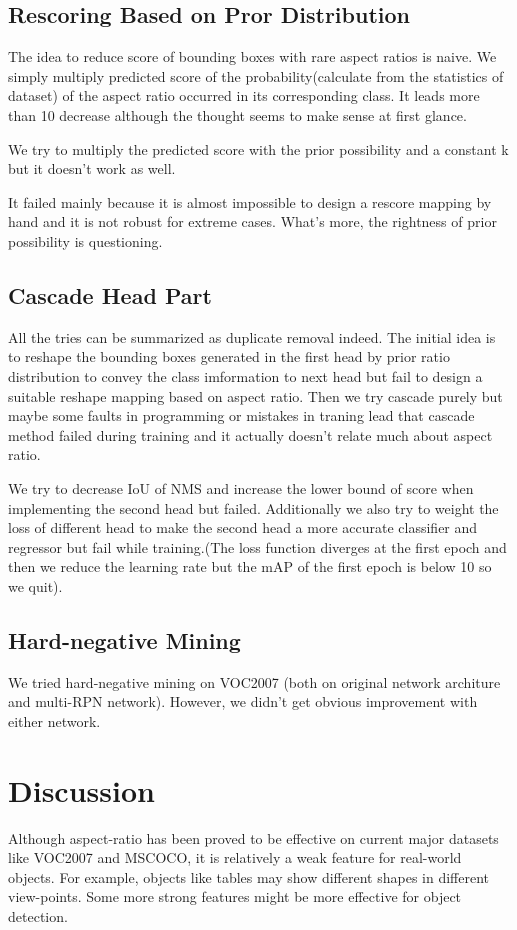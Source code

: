 \documentclass[10pt,twocolumn,letterpaper]{article}
\begin{document}
\subsection{Rescoring Based on Pror Distribution}
The idea to reduce score of bounding boxes with rare aspect ratios is naive. We simply multiply predicted score of the probability(calculate from the statistics of dataset) of the aspect ratio occurred in its corresponding class. It leads more than 10 decrease although the thought seems to make sense at first glance.
\par
We try to multiply the predicted score with the prior possibility and a constant k but it doesn't work as well.
\par
It failed mainly because it is almost impossible to design a rescore mapping by hand and it is not robust for extreme cases. What's more, the rightness of prior possibility is questioning.

\subsection{Cascade Head Part}
\par
All the tries can be summarized as duplicate removal indeed. The initial idea is to reshape the bounding boxes generated in the first head by prior ratio distribution to convey the class imformation to next head but fail to design a suitable reshape mapping based on aspect ratio. Then we try cascade purely but maybe some faults in programming or mistakes in traning lead that cascade method failed during training and it actually doesn't relate much about aspect ratio.
\par
We try to decrease IoU of NMS and increase the lower bound of score when implementing the second head but failed. Additionally we also try to weight the loss of different head to make the second head a more accurate classifier and regressor but fail while training.(The loss function diverges at the first epoch and then we reduce the learning rate but the mAP of the first epoch is below 10 so we quit).

\subsection{Hard-negative Mining}
We tried hard-negative mining on VOC2007 (both on original network architure and multi-RPN network). However, we didn't get obvious improvement with either network. 


\section{Discussion}
\par
Although aspect-ratio has been proved to be effective on current major datasets like VOC2007\cite{voc07} and MSCOCO\cite{coco}, it is relatively a weak feature for real-world objects. For example, objects like tables may show different shapes in different view-points. Some more strong features might be more effective for object detection.  
\end{document}
